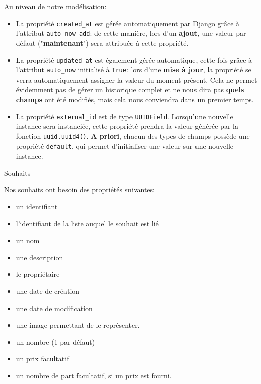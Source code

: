 \documentclass[11pt]{amsbook}
\newenvironment{sidebar}[1][r]
  {\wrapfigure{#1}{0.5\textwidth}\tcolorbox}
  {\endtcolorbox\endwrapfigure}
\begin{document}
Au niveau de notre modélisation:


\begin{itemize}

\item La propriété \texttt{created\_at} est gérée automatiquement par Django grâce à l’attribut \texttt{auto\_now\_add}: de cette manière, lors d’un \textbf{ajout}, une valeur par défaut ("\textbf{maintenant}") sera attribuée à cette propriété.

\item La propriété \texttt{updated\_at} est également gérée automatique, cette fois grâce à l’attribut \texttt{auto\_now} initialisé à \texttt{True}: lors d’une \textbf{mise à jour}, la propriété se verra automatiquement assigner la valeur du moment présent. Cela ne permet évidemment pas de gérer un historique complet et ne nous dira pas \textbf{quels champs} ont été modifiés, mais cela nous conviendra dans un premier temps.

\item La propriété \texttt{external\_id} est de type \texttt{UUIDField}. Lorsqu’une nouvelle instance sera instanciée, cette propriété prendra la valeur générée par la fonction \texttt{uuid.uuid4()}. \textbf{A priori}, chacun des types de champs possède une propriété \texttt{default}, qui permet d’initialiser une valeur sur une nouvelle instance.

\end{itemize}


\begin{sidebar}
Souhaits
\end{sidebar}

Nos souhaits ont besoin des propriétés suivantes:


\begin{itemize}

\item un identifiant

\item l’identifiant de la liste auquel le souhait est lié

\item un nom

\item une description

\item le propriétaire

\item une date de création

\item une date de modification

\item une image permettant de le représenter.

\item un nombre (1 par défaut)

\item un prix facultatif

\item un nombre de part facultatif, si un prix est fourni.

\end{itemize}
\end{document}

